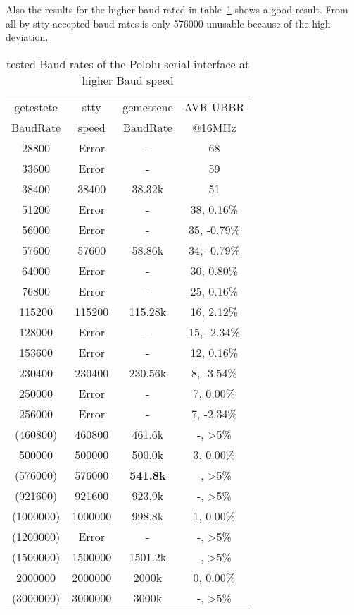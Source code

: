 Also the results for the higher baud rated in table~\ref{tab:pololubaudh} shows
a good result. 
From all by stty accepted baud rates is only 576000 unusable because of the high deviation.

\begin{table}[H]
  \begin{center}
    \begin{tabular}{| c | c | c || c |}
    \hline
    getestete  & stty  & gemessene  & AVR UBBR  \\
    BaudRate   & speed & BaudRate  & @16MHz \\
    \hline
    \hline
    \hline
      28800  &  Error   &   -       &    68 \\
    \hline
      33600  &  Error   &   -       &    59  \\
    \hline
      38400  &  38400   &  38.32k  &    51  \\
    \hline
      51200  &  Error   &   -       &    38,  0.16\%  \\
    \hline
      56000  &  Error   &   -       &    35, -0.79\%  \\
    \hline
      57600  &  57600   &  58.86k    &    34, -0.79\%  \\
    \hline
      64000  &  Error   &   -       &    30,  0.80\%  \\
    \hline
      76800  &  Error   &   -       &    25, 0.16\%  \\
    \hline
     115200  &  115200  &  115.28k   &    16, 2.12\%  \\
    \hline
     128000  &  Error   &   -       &    15, -2.34\%  \\
    \hline
     153600  &  Error   &   -       &    12, 0.16\%  \\
    \hline
     230400  &  230400  &  230.56k   &    8, -3.54\%  \\
    \hline
     250000  &  Error   &   -       &    7, 0.00\%  \\
    \hline
     256000  &  Error   &   -       &    7, -2.34\%  \\
    \hline
    (460800) &  460800  & 461.6k &    -, >5\%  \\
    \hline
     500000  &  500000  &  500.0k   &    3, 0.00\%  \\
    \hline
    (576000)  & 576000 & \bf{541.8k}  &    -, >5\%  \\
    \hline
    (921600) &  921600  & 923.9k &    -, >5\%  \\
    \hline
   (1000000) & 1000000 &   998.8k    &    1, 0.00\%  \\
    \hline
   (1200000) &  Error   &   -        &   -, >5\%  \\
    \hline
   (1500000) & 1500000  & 1501.2k &   -, >5\%  \\
    \hline
    2000000  & 2000000 &   2000k   & 0, 0.00\%  \\
    \hline
   (3000000) & 3000000 &  3000k &   -, >5\%   \\
    \hline
    \end{tabular}
  \end{center}
  \caption{tested Baud rates of the Pololu serial interface at higher Baud speed}
  \label{tab:pololubaudh}
\end{table}

